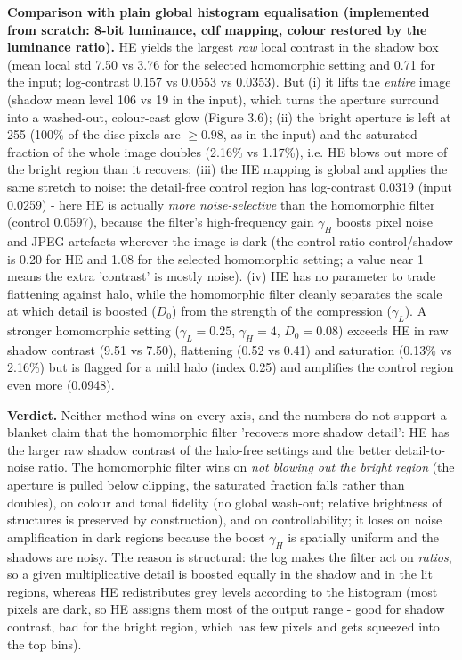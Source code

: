 \documentclass[10pt,a4paper]{article}
\begin{document}
\textbf{Comparison with plain global histogram equalisation (implemented from scratch: 8-bit luminance, cdf mapping, colour restored by the luminance ratio).} HE yields the largest \textit{raw} local contrast in the shadow box (mean local std 7.50 vs 3.76 for the selected homomorphic setting and 0.71 for the input; log-contrast 0.157 vs 0.0553 vs 0.0353). But (i) it lifts the \textit{entire} image (shadow mean level 106 vs 19 in the input), which turns the aperture surround into a washed-out, colour-cast glow (Figure 3.6); (ii) the bright aperture is left at 255 (100\% of the disc pixels are $\ge0.98$, as in the input) and the saturated fraction of the whole image doubles (2.16\% vs 1.17\%), i.e. HE blows out more of the bright region than it recovers; (iii) the HE mapping is global and applies the same stretch to noise: the detail-free control region has log-contrast 0.0319 (input 0.0259) - here HE is actually \textit{more noise-selective} than the homomorphic filter (control 0.0597), because the filter's high-frequency gain $\gamma_H$ boosts pixel noise and JPEG artefacts wherever the image is dark (the control ratio control/shadow is 0.20 for HE and 1.08 for the selected homomorphic setting; a value near 1 means the extra 'contrast' is mostly noise). (iv) HE has no parameter to trade flattening against halo, while the homomorphic filter cleanly separates the scale at which detail is boosted ($D_0$) from the strength of the compression ($\gamma_L$). A stronger homomorphic setting ($\gamma_L=0.25$, $\gamma_H=4$, $D_0=0.08$) exceeds HE in raw shadow contrast (9.51 vs 7.50), flattening (0.52 vs 0.41) and saturation (0.13\% vs 2.16\%) but is flagged for a mild halo (index 0.25) and amplifies the control region even more (0.0948).

\textbf{Verdict.} Neither method wins on every axis, and the numbers do not support a blanket claim that the homomorphic filter 'recovers more shadow detail': HE has the larger raw shadow contrast of the halo-free settings and the better detail-to-noise ratio. The homomorphic filter wins on \textit{not blowing out the bright region} (the aperture is pulled below clipping, the saturated fraction falls rather than doubles), on colour and tonal fidelity (no global wash-out; relative brightness of structures is preserved by construction), and on controllability; it loses on noise amplification in dark regions because the boost $\gamma_H$ is spatially uniform and the shadows are noisy. The reason is structural: the log makes the filter act on \textit{ratios}, so a given multiplicative detail is boosted equally in the shadow and in the lit regions, whereas HE redistributes grey levels according to the histogram (most pixels are dark, so HE assigns them most of the output range - good for shadow contrast, bad for the bright region, which has few pixels and gets squeezed into the top bins).
\end{document}
